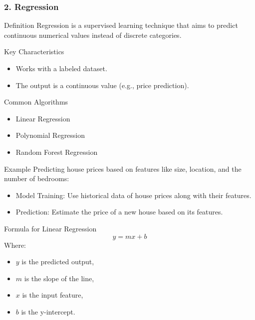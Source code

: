 \documentclass[aspectratio=169]{beamer}
\begin{document}
\begin{frame}[fragile]
    \frametitle{2. Regression}
    \begin{block}{Definition}
        Regression is a supervised learning technique that aims to predict continuous numerical values instead of discrete categories.
    \end{block}

    \begin{block}{Key Characteristics}
        \begin{itemize}
            \item Works with a labeled dataset.
            \item The output is a continuous value (e.g., price prediction).
        \end{itemize}
    \end{block}

    \begin{block}{Common Algorithms}
        \begin{itemize}
            \item Linear Regression
            \item Polynomial Regression
            \item Random Forest Regression
        \end{itemize}
    \end{block}

    \begin{block}{Example}
        Predicting house prices based on features like size, location, and the number of bedrooms:
        \begin{itemize}
            \item Model Training: Use historical data of house prices along with their features.
            \item Prediction: Estimate the price of a new house based on its features.
        \end{itemize}
    \end{block}

    \begin{block}{Formula for Linear Regression}
        \begin{equation}
            y = mx + b
        \end{equation}
        Where:
        \begin{itemize}
            \item \( y \) is the predicted output,
            \item \( m \) is the slope of the line,
            \item \( x \) is the input feature,
            \item \( b \) is the y-intercept.
        \end{itemize}
    \end{block}
\end{frame}
\end{document}
